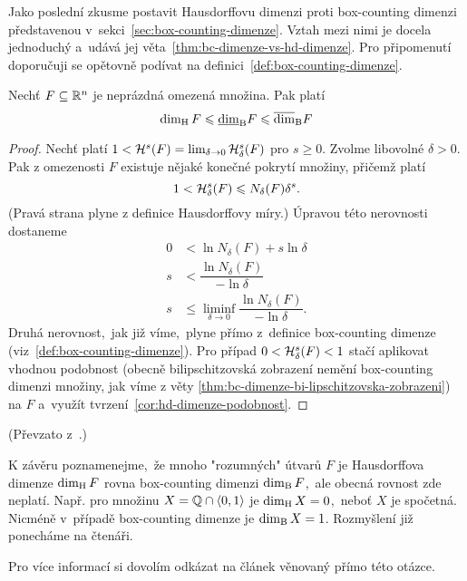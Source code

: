 Jako poslední zkusme postavit Hausdorffovu dimenzi proti box-counting dimenzi představenou v~sekci~\ref{sec:box-counting-dimenze}. Vztah mezi nimi je docela jednoduchý a~udává jej věta~\ref{thm:bc-dimenze-vs-hd-dimenze}. Pro připomenutí doporučuji se opětovně podívat na definici~\ref{def:box-counting-dimenze}.
\begin{theorem}\label{thm:bc-dimenze-vs-hd-dimenze}
    Nechť $F\subseteq\mathbb{R}^n$ je neprázdná omezená množina. Pak platí
    \[\operatorname{dim_H}{F}\leqslant\underline{\dim}_\textup{B}{F}\leqslant\overline{\dim}_\textup{B}{F}\]
\end{theorem}
\begin{proof}
    Nechť platí $1<\mathcal{H}^{s}(F)=\lim_{\delta\to 0}\mathcal{H}_{\delta}^{s}(F)$ pro $s\geqslant 0$. Zvolme libovolné $\delta>0$. Pak z omezenosti $F$ existuje nějaké konečné pokrytí množiny, přičemž platí
    \[1<\mathcal{H}_{\delta}^{s}(F)\leqslant N_\delta(F)\delta^s.\]
    (Pravá strana plyne z definice Hausdorffovy míry.) Úpravou této nerovnosti dostaneme
    \begin{align*}
        0&<\ln{N_\delta(F)}+s\ln{\delta}\\
        s&<\dfrac{\ln{N_\delta(F)}}{-\ln{\delta}}\\
        s&\leqslant\liminf_{\delta\to 0}\dfrac{\ln{N_\delta(F)}}{-\ln{\delta}}.
    \end{align*}
    Druhá nerovnost,~jak již víme,~plyne přímo z~definice box-counting dimenze (viz~\ref{def:box-counting-dimenze}). Pro případ $0<\mathcal{H}_{\delta}^{s}(F)<1$ stačí aplikovat vhodnou podobnost (obecně bilipschitzovská zobrazení nemění box-counting dimenzi množiny, jak víme z věty \ref{thm:bc-dimenze-bi-lipschitzovska-zobrazeni}) na $F$ a~využít tvrzení~\ref{cor:hd-dimenze-podobnost}.
\end{proof}
(Převzato z~\citep[str. 50]{Falconer2014}.)

K závěru poznamenejme,~že mnoho "rozumných" útvarů $F$ je Hausdorffova dimenze $\operatorname{dim_H}{F}$ rovna box-counting dimenzi $\operatorname{dim_B}{F}$,~ale obecná rovnost zde neplatí. Např. pro množinu $X=\mathbb{Q}\cap\langle0,1\rangle$ je $\operatorname{dim_H}{X}=0$,~neboť $X$ je spočetná. Nicméně v~případě box-counting dimenze je $\operatorname{dim_B}{X}=1$. Rozmyšlení již ponecháme na čtenáři.

Pro více informací si dovolím odkázat na článek \cite{Falconer1989} věnovaný přímo této otázce.